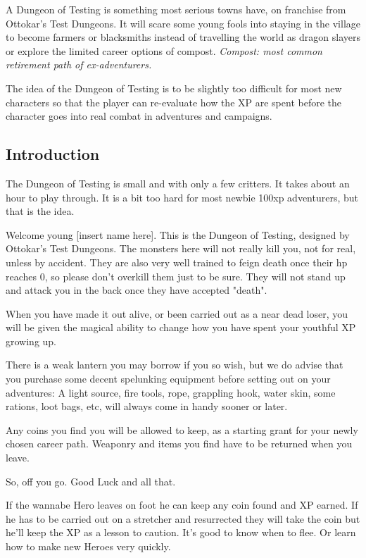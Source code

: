 A Dungeon of Testing is something most serious towns have, on franchise from Ottokar's Test Dungeons. It will scare some young fools into staying in the village to become farmers or blacksmiths instead of travelling the world as dragon slayers or explore the limited career options of compost. \emph{Compost: most common retirement path of ex-adventurers.}

The idea of the Dungeon of Testing is to be slightly too difficult for most new characters so that the player can re-evaluate how the XP are spent before the character goes into real combat in adventures and campaigns.




\subsection*{Introduction}

The Dungeon of Testing is small and with only a few critters. It takes about an hour to play through. It is a bit too hard for most newbie 100xp adventurers, but that is the idea.

\begin{readoutloud}
Welcome young [insert name here]. This is the Dungeon of Testing, designed by Ottokar's Test Dungeons. The monsters here will not really kill you, not for real, unless by accident. They are also very well trained to feign death once their hp reaches 0, so please don't overkill them just to be sure. They will not stand up and attack you in the back once they have accepted "death".

When you have made it out alive, or been carried out as a near dead loser, you will be given the magical ability to change how you have spent your youthful XP growing up.

There is a weak lantern you may borrow if you so wish, but we do advise that you purchase some decent spelunking equipment before setting out on your adventures: A light source, fire tools, rope, grappling hook, water skin, some rations, loot bags, etc, will always come in handy sooner or later.

Any coins you find you will be allowed to keep, as a starting grant for your newly chosen career path. Weaponry and items you find have to be returned when you leave.

So, off you go. Good Luck and all that.
\end{readoutloud}

\noindent
If the wannabe Hero leaves on foot he can keep any coin found and XP earned. If he has to be carried out on a stretcher and resurrected they will take the coin but he'll keep the XP as a lesson to caution. It's good to know when to flee. Or learn how to make new Heroes very quickly.




